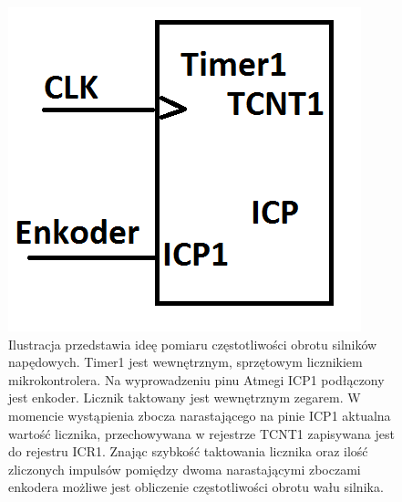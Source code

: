   \begin{figure}[H]
    \begin{center}
      \includegraphics[scale=0.4]{imgs/predkosc.png}
 	\caption[Pomiar częstotliwości obrotu silnika.]{\small{Ilustracja przedstawia ideę pomiaru częstotliwości obrotu silników napędowych. Timer1 jest wewnętrznym, sprzętowym licznikiem mikrokontrolera. Na wyprowadzeniu pinu Atmegi ICP1 podłączony jest enkoder. Licznik taktowany jest wewnętrznym zegarem. W momencie wystąpienia zbocza narastającego na pinie ICP1 aktualna wartość licznika, przechowywana w rejestrze TCNT1 zapisywana jest do rejestru ICR1. Znając szybkość taktowania licznika oraz ilość zliczonych impulsów pomiędzy dwoma narastającymi zboczami enkodera możliwe jest obliczenie częstotliwości obrotu wału silnika.}}
	\label{predkosc}
    \end{center}
  \end{figure}  

